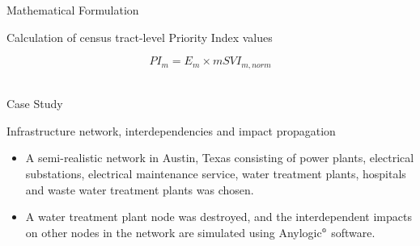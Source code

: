 \documentclass[ctrsize,landscape]{baposter}
\begin{document}
\begin{poster}
\begin{posterbox}[name=install,span=1,column=1,row=0]{Mathematical Formulation}
    \normalsize{\begin{description}
        \item [Calculation of census tract-level Priority Index values]
    \end{description}}
    \footnotesize{\begin{equation*}
     PI_{m}=E_{m}\times mSVI_{m,norm}
    \label{eq:PI}
    \end{equation*}}\\[-3em]
\end{posterbox}

\begin{posterbox}[name=figures,column=1,below=install, above=foottext]{Case Study}
\begin{description}
    \item [Infrastructure network, interdependencies and impact propagation]
\end{description}

    \begin{itemize}
        \item A semi-realistic network in Austin, Texas consisting of power plants, electrical substations, electrical maintenance service, water treatment plants, hospitals and waste water treatment plants was chosen.
        \item A water treatment plant node was destroyed, and the interdependent impacts on other nodes in the network are simulated using Anylogic$\textsuperscript{\tiny\textregistered}$ software.
    \end{itemize}
    \vspace*{0.5cm}
   

\end{posterbox}
\end{poster}
\end{document}
